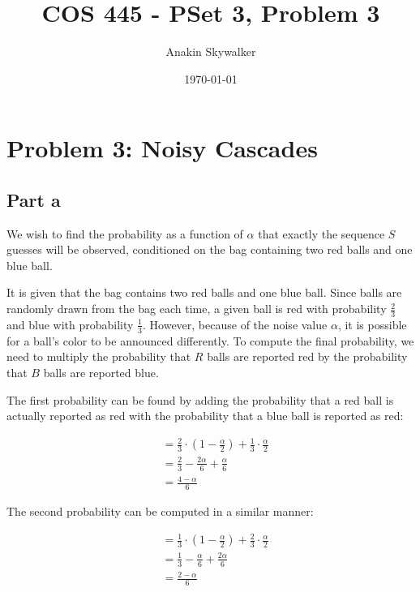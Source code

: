 \documentclass[12pt]{article}%
\begin{document}
\title{COS 445 - PSet 3, Problem 3} %
\author{Anakin Skywalker} %
\date{\today}
\maketitle
\section*{Problem 3: Noisy Cascades}
\subsection*{Part a}

We wish to find the probability as a function of $\alpha$ that exactly the sequence $S$ guesses will be observed, conditioned on the bag containing two red balls and one blue ball.

It is given that the bag contains two red balls and one blue ball. Since balls are randomly drawn from the bag each time, a given ball is red with probability $\frac{2}{3}$ and blue with probability $\frac{1}{3}$. However, because of the noise value $\alpha$, it is possible for a ball's color to be announced differently. To compute the final probability, we need to multiply the probability that $R$ balls are reported red by the probability that $B$ balls are reported blue.

The first probability can be found by adding the probability that a red ball is actually reported as red with the probability that a blue ball is reported as red:

\begin{equation}
\begin{split}
&= \frac{2}{3} \cdot (1 - \frac{\alpha}{2}) + \frac{1}{3} \cdot \frac{\alpha}{2}\\
&= \frac{2}{3} - \frac{2\alpha}{6} + \frac{\alpha}{6}\\
&= \frac{4 - \alpha}{6}
\end{split}
\end{equation}

The second probability can be computed in a similar manner:

\begin{equation}
\begin{split}
&= \frac{1}{3} \cdot (1 - \frac{\alpha}{2}) + \frac{2}{3} \cdot \frac{\alpha}{2}\\
&= \frac{1}{3} - \frac{\alpha}{6} + \frac{2\alpha}{6}\\
&= \frac{2 - \alpha}{6}
\end{split}
\end{equation}
\end{document}
